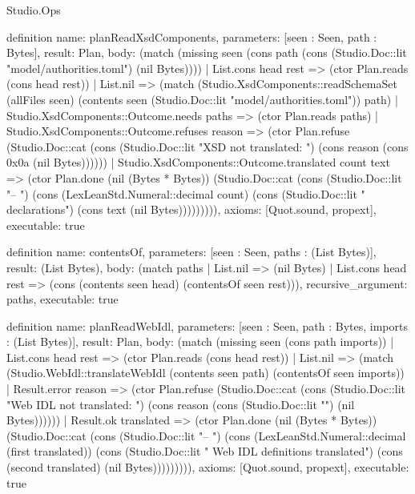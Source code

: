 \begin{lexlean}{Studio.Ops}
\begin{semanticmodule}
definition{
  name: planReadXsdComponents,
  parameters: [seen : Seen, path : Bytes],
  result: Plan,
  body: (match (missing seen (cons path (cons (Studio.Doc::lit "model/authorities.toml") (nil Bytes))))
    | List.cons head rest => (ctor Plan.reads (cons head rest))
    | List.nil => (match (Studio.XsdComponents::readSchemaSet (allFiles seen) (contents seen (Studio.Doc::lit "model/authorities.toml")) path)
      | Studio.XsdComponents::Outcome.needs paths => (ctor Plan.reads paths)
      | Studio.XsdComponents::Outcome.refuses reason => (ctor Plan.refuse (Studio.Doc::cat (cons (Studio.Doc::lit "XSD not translated: ") (cons reason (cons 0x0a (nil Bytes))))))
      | Studio.XsdComponents::Outcome.translated count text => (ctor Plan.done (nil (Bytes * Bytes)) (Studio.Doc::cat (cons (Studio.Doc::lit "-- ") (cons (LexLeanStd.Numeral::decimal count) (cons (Studio.Doc::lit " declarations\n") (cons text (nil Bytes))))))))),
  axioms: [Quot.sound, propext],
  executable: true
}

definition{
  name: contentsOf,
  parameters: [seen : Seen, paths : (List Bytes)],
  result: (List Bytes),
  body: (match paths
    | List.nil => (nil Bytes)
    | List.cons head rest => (cons (contents seen head) (contentsOf seen rest))),
  recursive_argument: paths,
  executable: true
}

definition{
  name: planReadWebIdl,
  parameters: [seen : Seen, path : Bytes, imports : (List Bytes)],
  result: Plan,
  body: (match (missing seen (cons path imports))
    | List.cons head rest => (ctor Plan.reads (cons head rest))
    | List.nil => (match (Studio.WebIdl::translateWebIdl (contents seen path) (contentsOf seen imports))
      | Result.error reason => (ctor Plan.refuse (Studio.Doc::cat (cons (Studio.Doc::lit "Web IDL not translated: ") (cons reason (cons (Studio.Doc::lit "\n") (nil Bytes))))))
      | Result.ok translated => (ctor Plan.done (nil (Bytes * Bytes)) (Studio.Doc::cat (cons (Studio.Doc::lit "-- ") (cons (LexLeanStd.Numeral::decimal (first translated)) (cons (Studio.Doc::lit " Web IDL definitions translated\n") (cons (second translated) (nil Bytes))))))))),
  axioms: [Quot.sound, propext],
  executable: true
}


\end{semanticmodule}
\end{lexlean}
